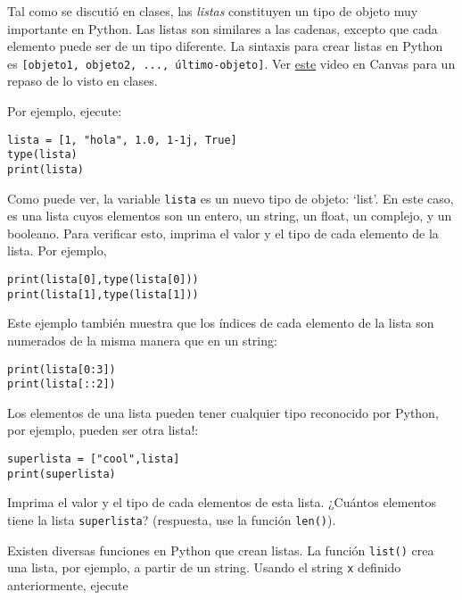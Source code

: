 \documentclass[11pt]{exam}
\begin{document}
\begin{questions}
\item Tal como se discutió en clases, las \textit{listas} constituyen un tipo de objeto muy importante en Python. Las listas son  similares a las cadenas, excepto que cada elemento puede ser de un tipo diferente. La sintaxis para crear listas en Python es \texttt{[objeto1, objeto2, ..., último-objeto]}. Ver \href{https://udec.instructure.com/courses/51022/pages/listas?module_item_id=1904631}{este} video en Canvas para un repaso de lo visto en clases. 

Por ejemplo, ejecute:

\begin{verbatim}
lista = [1, "hola", 1.0, 1-1j, True]
type(lista)
print(lista)
\end{verbatim}

Como puede ver, la variable \texttt{lista} es un nuevo tipo de objeto: `list'. En este caso, es una lista cuyos elementos son un entero, un string, un float, un complejo, y un booleano. Para verificar esto, imprima el valor y el tipo de cada elemento de la lista. Por ejemplo,

\begin{verbatim}
print(lista[0],type(lista[0]))
print(lista[1],type(lista[1]))
\end{verbatim}

Este ejemplo también muestra que los índices de cada elemento de la lista son numerados de la misma manera que en un string:

\begin{verbatim}
print(lista[0:3])
print(lista[::2])
\end{verbatim}

\item Los elementos de una lista pueden tener cualquier tipo reconocido por Python, por ejemplo, pueden ser otra lista!:

\begin{verbatim}
superlista = ["cool",lista]
print(superlista)
\end{verbatim}

Imprima el valor y el tipo de cada elementos de esta lista. ¿Cuántos elementos tiene la lista \texttt{superlista}? (respuesta, use la función \texttt{len()}).

\item Existen diversas funciones en Python que crean listas. La función \texttt{list()} crea una lista, por ejemplo, a partir de un string. Usando el string \texttt{x} definido anteriormente, ejecute


\end{questions}
\end{document}
